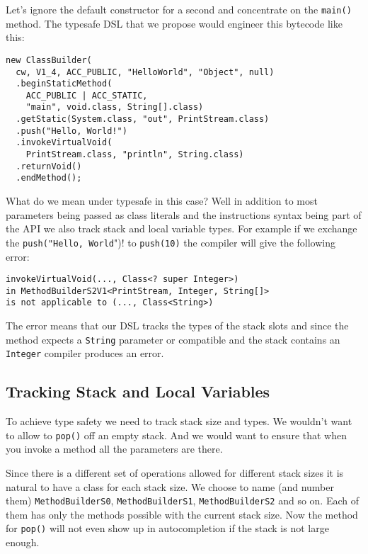 \documentclass{sig-alternate}
\begin{document}
Let's ignore the default constructor for a second and concentrate on the \verb!main()! method. The typesafe DSL that we propose would engineer this bytecode like this:

\begin{verbatim}
new ClassBuilder(
  cw, V1_4, ACC_PUBLIC, "HelloWorld", "Object", null)    
  .beginStaticMethod(
    ACC_PUBLIC | ACC_STATIC, 
    "main", void.class, String[].class)
  .getStatic(System.class, "out", PrintStream.class)
  .push("Hello, World!")
  .invokeVirtualVoid(
    PrintStream.class, "println", String.class)
  .returnVoid()
  .endMethod();
\end{verbatim}

What do we mean under typesafe in this case? Well in addition to most parameters being passed as class literals and the instructions syntax being part of the API we also track stack and local variable types. For example if we exchange the \verb!push("Hello, World!")! to \verb!push(10)! the compiler will give the following error:

\begin{verbatim}
invokeVirtualVoid(..., Class<? super Integer>) 
in MethodBuilderS2V1<PrintStream, Integer, String[]>
is not applicable to (..., Class<String>)
\end{verbatim}

The error means that our DSL tracks the types of the stack slots and since the method expects a \verb!String! parameter or compatible and the stack contains an \verb!Integer! compiler produces an error. 

\subsection{Tracking Stack and Local Variables}

To achieve type safety we need to track stack size and types. We wouldn't want to allow to \verb!pop()! off an empty stack. And we would want to ensure that when you invoke a method all the parameters are there. 

Since there is a different set of operations allowed for different stack sizes it is natural to have a class for each stack size. We choose to name (and number them) \verb!MethodBuilderS0!, \verb!MethodBuilderS1!, \verb!MethodBuilderS2! and so on. Each of them has only the methods possible with the current stack size. Now the method for \verb!pop()! will not even show up in autocompletion if the stack is not large enough.
\end{document}
